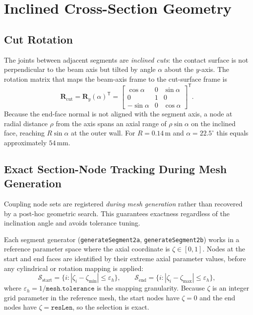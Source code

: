 \documentclass{article}
\begin{document}
\section{Inclined Cross-Section Geometry}
\label{sec:geometry}

\subsection{Cut Rotation}

The joints between adjacent segments are \emph{inclined cuts}: the contact
surface is not perpendicular to the beam axis but tilted by angle $\alpha$
about the $y$-axis.  The rotation matrix that maps the beam-axis frame to the
cut-surface frame is
\begin{equation}
    \bm{R}_{\text{cut}} = \bm{R}_y(\alpha)^{\mathsf{T}}
    = \begin{bmatrix}
         \cos\alpha & 0 &  \sin\alpha \\
         0          & 1 &  0          \\
        -\sin\alpha & 0 &  \cos\alpha
      \end{bmatrix}^{\mathsf{T}}.
\end{equation}
Because the end-face normal is not aligned with the segment axis, a node at
radial distance $\rho$ from the axis spans an axial range of
$\rho\sin\alpha$ on the inclined face, reaching $R\sin\alpha$ at the outer
wall.  For $R = 0.14\,\mathrm{m}$ and $\alpha = 22.5^\circ$ this equals
approximately $54\,\mathrm{mm}$.

\subsection{Exact Section-Node Tracking During Mesh Generation}

Coupling node sets are registered \emph{during mesh generation} rather than
recovered by a post-hoc geometric search.  This guarantees exactness
regardless of the inclination angle and avoids tolerance tuning.

Each segment generator (\texttt{generateSegment2a}, \texttt{generateSegment2b})
works in a reference parameter space where the axial coordinate is $\zeta \in [0,1]$.
Nodes at the start and end faces are identified by their extreme axial parameter
values, before any cylindrical or rotation mapping is applied:
\begin{equation}
    \mathcal{S}_{\text{start}} = \bigl\{i : |\zeta_i - \zeta_{\min}| \leq \varepsilon_h\bigr\},
    \qquad
    \mathcal{S}_{\text{end}}   = \bigl\{i : |\zeta_i - \zeta_{\max}| \leq \varepsilon_h\bigr\},
\end{equation}
where $\varepsilon_h = 1/\texttt{mesh.tolerance}$ is the snapping granularity.
Because $\zeta$ is an integer grid parameter in the reference mesh, the start
nodes have $\zeta = 0$ and the end nodes have $\zeta = \texttt{resLen}$, so
the selection is exact.
\end{document}
